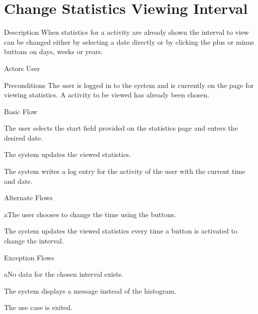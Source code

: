 \section{Change Statistics Viewing Interval}

%
\begin{cpart}{Description}
When statistics for a activity are already shown the interval to view can be changed either by selecting a date directly or by clicking the plus or minus buttons on days, weeks or years.
\end{cpart}


%
\begin{cpart}{Actors}
User
\end{cpart}

%
\begin{cpart}{Preconditions}
The user is logged in to the system and is currently on the page for viewing statistics. A activity to be viewed has already been chosen.
\end{cpart}

%
\begin{cpartList}{Basic Flow}
  \item The user selects the start field provided on the statistics page and enters the desired date.
  \item The system updates the viewed statistics.
    \item The system writes a log entry for the activity of the user with the current time and date.
\end{cpartList}

%
\begin{cpartList}{Alternate Flows}
  \begin{innerList}{1}{a}{The user chooses to change the time using the buttons.}
    \item The system updates the viewed statistics every time a button is activated to change the interval.
  \end{innerList}
\end{cpartList}

%
\begin{cpartList}{Exception Flows}
  \begin{innerList}{4}{a}{No data for the chosen interval exists.}
    \item The system displays a message instead of the histogram.
    \item The use case is exited.
  \end{innerList}
\end{cpartList}

